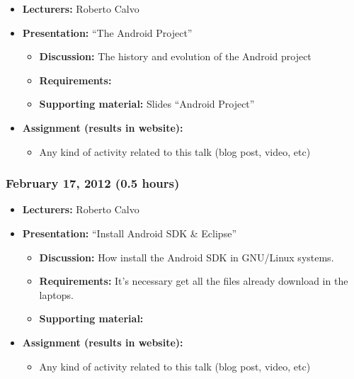 \documentclass[a4paper]{article}
\begin{document}
\begin{itemize}
\item \textbf{Lecturers:} Roberto Calvo
\item \textbf{Presentation:} ``The Android Project''
  \begin{itemize}
  \item \textbf{Discussion:} The history and evolution of the Android
    project
  \item \textbf{Requirements:} 
  \item \textbf{Supporting material:} Slides ``Android Project''
  \end{itemize}
\item \textbf{Assignment (results in website):}
  \begin{itemize}
  \item Any kind of activity
    related to this talk (blog post, video, etc)
  \end{itemize}
\end{itemize}


\subsubsection{February 17, 2012 (0.5 hours)}

\begin{itemize}
\item \textbf{Lecturers:} Roberto Calvo
\item \textbf{Presentation:} ``Install Android SDK \& Eclipse''
  \begin{itemize}
  \item \textbf{Discussion:} How install the Android SDK in GNU/Linux
    systems.
  \item \textbf{Requirements:} It's necessary get all the files
    already download in the laptops.
  \item \textbf{Supporting material:}
  \end{itemize}
\item \textbf{Assignment (results in website):}
  \begin{itemize}
  \item Any kind of activity
    related to this talk (blog post, video, etc)
  \end{itemize}
\end{itemize}
\end{document}
